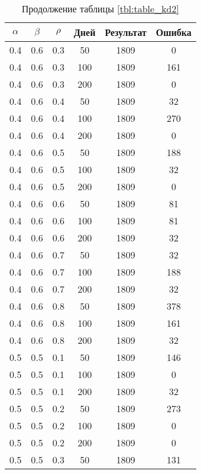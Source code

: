 \begin{table}[h]
	\begin{center}
        \captionsetup{justification=raggedright,singlelinecheck=off}
		\caption*{Продолжение таблицы \ref{tbl:table_kd2}}
		\begin{tabular}{|c|c|c|c|c|c|}
  	\hline
	$\alpha$ & $\beta$ & $\rho$ & Дней & Результат & Ошибка \\\hline
		0.4 &  0.6 &  0.3 &   50 &  1809 &     0 \\
		0.4 &  0.6 &  0.3 &  100 &  1809 &   161 \\
		0.4 &  0.6 &  0.3 &  200 &  1809 &     0 \\
	   \hline
		0.4 &  0.6 &  0.4 &   50 &  1809 &    32 \\
		0.4 &  0.6 &  0.4 &  100 &  1809 &   270 \\
		0.4 &  0.6 &  0.4 &  200 &  1809 &     0 \\
	   \hline
		0.4 &  0.6 &  0.5 &   50 &  1809 &   188 \\
		0.4 &  0.6 &  0.5 &  100 &  1809 &    32 \\
		0.4 &  0.6 &  0.5 &  200 &  1809 &     0 \\
	   \hline
		0.4 &  0.6 &  0.6 &   50 &  1809 &    81 \\
		0.4 &  0.6 &  0.6 &  100 &  1809 &    81 \\
		0.4 &  0.6 &  0.6 &  200 &  1809 &    32 \\
	   \hline
		0.4 &  0.6 &  0.7 &   50 &  1809 &    32 \\
		0.4 &  0.6 &  0.7 &  100 &  1809 &   188 \\
		0.4 &  0.6 &  0.7 &  200 &  1809 &    32 \\
	   \hline
		0.4 &  0.6 &  0.8 &   50 &  1809 &   378 \\
		0.4 &  0.6 &  0.8 &  100 &  1809 &   161 \\
		0.4 &  0.6 &  0.8 &  200 &  1809 &    32 \\
	   \hline
		0.5 &  0.5 &  0.1 &   50 &  1809 &   146 \\
		0.5 &  0.5 &  0.1 &  100 &  1809 &     0 \\
		0.5 &  0.5 &  0.1 &  200 &  1809 &    32 \\
	   \hline
		0.5 &  0.5 &  0.2 &   50 &  1809 &   273 \\
		0.5 &  0.5 &  0.2 &  100 &  1809 &     0 \\
		0.5 &  0.5 &  0.2 &  200 &  1809 &     0 \\
	   \hline
		0.5 &  0.5 &  0.3 &   50 &  1809 &   131 \\

\end{tabular}
\end{center}
\end{table}
